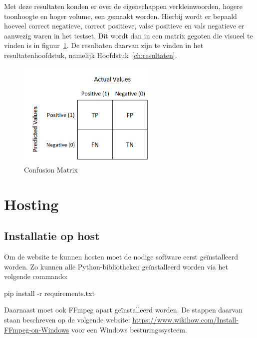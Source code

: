 Met deze resultaten konden er over de eigenschappen verkleinwoorden, hogere toonhoogte en hoger volume, een  gemaakt worden. Hierbij wordt er bepaald hoeveel correct negatieve, correct positieve, valse positieve en vals negatieve er aanwezig waren in het testset. Dit wordt dan in een matrix gegoten die visueel te vinden is in figuur~\ref{fig:confusion_matrix}. De resultaten daarvan zijn te vinden in het resultatenhoofdstuk, namelijk Hoofdstuk~\ref{ch:resultaten}.

\begin{figure}
    \centering
    \includegraphics[width=0.6\textwidth]{./img/confusion_matrix}
    \caption{\label{fig:confusion_matrix} Confusion Matrix~\autocite{Jain2020}}
\end{figure}

\section{Hosting}
\subsection{Installatie op host}
Om de website te kunnen hosten moet de nodige software eerst geïnstalleerd worden. Zo kunnen alle Python-bibliotheken geïnstalleerd worden via het volgende commando:
\begin{python}
	pip install -r requirements.txt
\end{python}

Daarnaast moet ook FFmpeg apart geïnstalleerd worden. De stappen daarvan staan beschreven op de volgende website: \url{https://www.wikihow.com/Install-FFmpeg-on-Windows} voor een Windows besturingssysteem.

